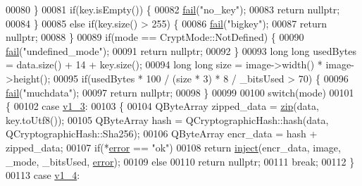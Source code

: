 \begin{DoxyCode}
00080     \}
00081     \textcolor{keywordflow}{if}(key.isEmpty()) \{
00082         \hyperlink{class_model_p_c_a47464b59b7e37fcee25e55475708aabd}{fail}(\textcolor{stringliteral}{"no\_key"});
00083         \textcolor{keywordflow}{return} \textcolor{keyword}{nullptr};
00084     \}
00085     \textcolor{keywordflow}{else} \textcolor{keywordflow}{if}(key.size() > 255) \{
00086         \hyperlink{class_model_p_c_a47464b59b7e37fcee25e55475708aabd}{fail}(\textcolor{stringliteral}{"bigkey"});
00087         \textcolor{keywordflow}{return} \textcolor{keyword}{nullptr};
00088     \}
00089     \textcolor{keywordflow}{if}(mode == CryptMode::NotDefined) \{
00090         \hyperlink{class_model_p_c_a47464b59b7e37fcee25e55475708aabd}{fail}(\textcolor{stringliteral}{"undefined\_mode"});
00091         \textcolor{keywordflow}{return} \textcolor{keyword}{nullptr};
00092     \}
00093     \textcolor{keywordtype}{long} \textcolor{keywordtype}{long} usedBytes = data.size() + 14 + key.size();
00094     \textcolor{keywordtype}{long} \textcolor{keywordtype}{long} size = image->width() * image->height();
00095     \textcolor{keywordflow}{if}(usedBytes * 100 / (size * 3) * 8 / \_bitsUsed > 70) \{
00096         \hyperlink{class_model_p_c_a47464b59b7e37fcee25e55475708aabd}{fail}(\textcolor{stringliteral}{"muchdata"});
00097         \textcolor{keywordflow}{return} \textcolor{keyword}{nullptr};
00098     \}
00099 
00100     \textcolor{keywordflow}{switch}(mode)
00101     \{
00102         \textcolor{keywordflow}{case} \hyperlink{class_model_p_c_a296dd7afe3e1c49b3da25fd644fe4ceba7612e38de7178170655a56ddcf96e12c}{v1\_3}:
00103         \{
00104             QByteArray zipped\_data = \hyperlink{class_model_p_c_afebbbfa4b07deba4f68fc6dfb50f353f}{zip}(data, key.toUtf8());
00105             QByteArray hash = QCryptographicHash::hash(data, QCryptographicHash::Sha256);
00106             QByteArray encr\_data = hash + zipped\_data;
00107             \textcolor{keywordflow}{if}(*\hyperlink{class_model_p_c_a4e5a9c0ca1f06fe5bc478b6bf248c37c}{error} == \textcolor{stringliteral}{"ok"})
00108                 \textcolor{keywordflow}{return} \hyperlink{class_model_p_c_aada6a04d81ada8f2b4ba18108c8d6f10}{inject}(encr\_data, image, \_mode, \_bitsUsed, \hyperlink{class_model_p_c_a4e5a9c0ca1f06fe5bc478b6bf248c37c}{error});
00109             \textcolor{keywordflow}{else}
00110                 \textcolor{keywordflow}{return} \textcolor{keyword}{nullptr};
00111             \textcolor{keywordflow}{break};
00112         \}
00113         \textcolor{keywordflow}{case} \hyperlink{class_model_p_c_a296dd7afe3e1c49b3da25fd644fe4ceba43138df6b33a6b2bf608768907f95abc}{v1\_4}:

\end{DoxyCode}
